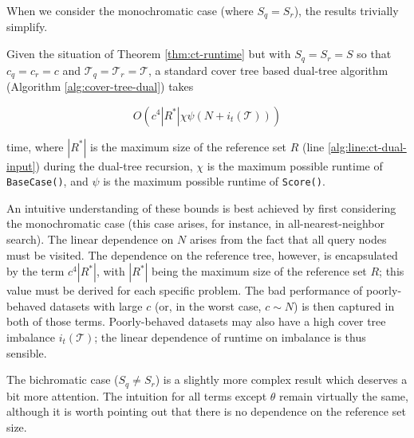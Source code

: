 When we consider the monochromatic case (where $S_q = S_r$), the results
trivially simplify.

\begin{cor}
\label{cor:ct-runtime-mono}
Given the situation of Theorem \ref{thm:ct-runtime} but with $S_q = S_r = S$ so
that $c_q = c_r = c$ and $\mathscr{T}_q = \mathscr{T}_r = \mathscr{T}$, a
standard cover tree based dual-tree algorithm (Algorithm
\ref{alg:cover-tree-dual}) takes

\begin{equation}
O\left(c^4 |R^*| \chi \psi (N + i_t(\mathscr{T}))\right)
\end{equation}

\noindent time, where $ | R^* | $ is the maximum size of the reference set $R$
(line \ref{alg:line:ct-dual-input}) during the dual-tree recursion, $\chi$ is
the maximum possible runtime of \texttt{BaseCase()}, and $\psi$ is the maximum
possible runtime of \texttt{Score()}.
\end{cor}

An intuitive understanding of these bounds is best achieved by first considering
the monochromatic case (this case arises, for instance, in all-nearest-neighbor
search).  The linear dependence on $N$ arises from the fact that all query nodes
must be visited.  The dependence on the reference tree, however, is encapsulated
by the term $c^4 |R^*|$, with $|R^*|$ being the maximum size of the reference
set $R$; this value must be derived for each specific problem.  The bad
performance of poorly-behaved datasets with large $c$ (or, in the worst case, $c
\sim N$) is then captured in both of those terms.  Poorly-behaved datasets may
also have a high cover tree imbalance $i_t(\mathscr{T})$; the linear dependence of
runtime on imbalance is thus sensible.

The bichromatic case ($S_q \ne S_r$) is a slightly more complex result which
deserves a bit more attention.  The intuition for all terms except $\theta$
remain virtually the same, although it is worth pointing out that there is
no dependence on the reference set size.

